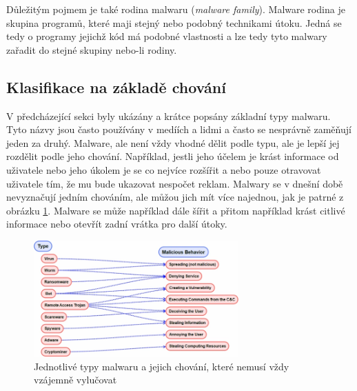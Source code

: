 Důležitým pojmem je také rodina malwaru (\textit{malware family}). Malware rodina je skupina programů, které maji stejný nebo podobný technikami útoku. Jedná se tedy o programy jejichž kód má podobné vlastnosti a lze tedy tyto malwary zařadit do stejné skupiny nebo-li rodiny. 

\subsection*{Klasifikace na základě chování}
V předcházející sekci byly ukázány a krátce popsány základní typy malwaru. Tyto názvy jsou často používány v medíích a lidmi a často se nesprávně zaměňují jeden za druhý.
Malware, ale není vždy vhodné dělit podle typu, ale je lepší jej rozdělit podle jeho chování. Například, jestli jeho účelem je krást informace od uživatele nebo jeho úkolem je se 
co nejvíce rozšířit a nebo pouze otravovat uživatele tím, že mu bude ukazovat nespočet reklam. Malwary se v dnešní době nevyznačují jedním chováním, ale můžou jich mít více najednou, jak 
je patrné z obrázku \ref{behavior}. Malware se může například dále šířit a přitom například krást citlivé informace nebo otevřít zadní vrátka pro další útoky. 

\begin{figure}[h]
	\centering
        \includegraphics[width=0.7\textwidth]{obrazky/behavior.png}
	\caption{Jednotlivé typy malwaru a jejich chování, které nemusí vždy vzájemně vylučovat}
    \label{behavior}
\end{figure}
\newpage

